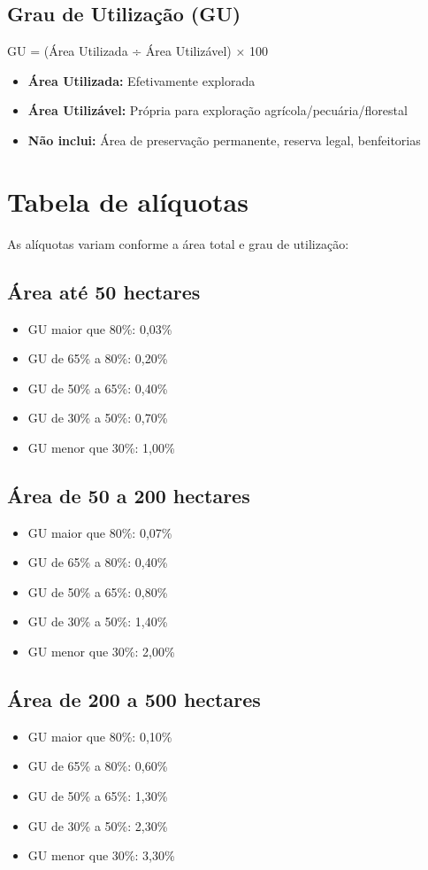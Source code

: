 \documentclass[12pt,a4paper]{article}
\begin{document}
\subsection{Grau de Utilização (GU)}
GU = (Área Utilizada ÷ Área Utilizável) × 100

\begin{itemize}
    \item \textbf{Área Utilizada:} Efetivamente explorada
    \item \textbf{Área Utilizável:} Própria para exploração agrícola/pecuária/florestal
    \item \textbf{Não inclui:} Área de preservação permanente, reserva legal, benfeitorias
\end{itemize}

\section{Tabela de alíquotas}

As alíquotas variam conforme a área total e grau de utilização:

\subsection{Área até 50 hectares}
\begin{itemize}
    \item GU maior que 80\%: 0,03\%
    \item GU de 65\% a 80\%: 0,20\%
    \item GU de 50\% a 65\%: 0,40\%
    \item GU de 30\% a 50\%: 0,70\%
    \item GU menor que 30\%: 1,00\%
\end{itemize}

\subsection{Área de 50 a 200 hectares}
\begin{itemize}
    \item GU maior que 80\%: 0,07\%
    \item GU de 65\% a 80\%: 0,40\%
    \item GU de 50\% a 65\%: 0,80\%
    \item GU de 30\% a 50\%: 1,40\%
    \item GU menor que 30\%: 2,00\%
\end{itemize}

\subsection{Área de 200 a 500 hectares}
\begin{itemize}
    \item GU maior que 80\%: 0,10\%
    \item GU de 65\% a 80\%: 0,60\%
    \item GU de 50\% a 65\%: 1,30\%
    \item GU de 30\% a 50\%: 2,30\%
    \item GU menor que 30\%: 3,30\%
\end{itemize}
\end{document}
